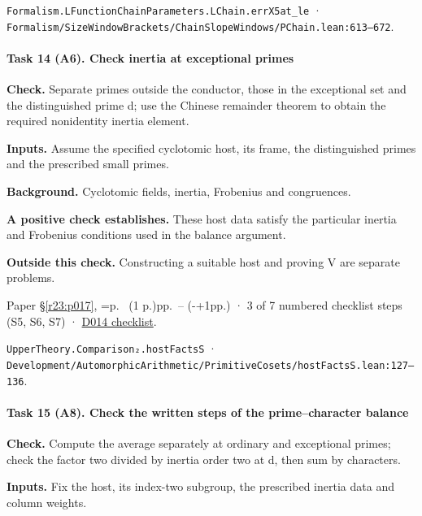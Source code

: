\nolinkurl{Formalism.LFunctionChainParameters.LChain.errX5at_le} · \nolinkurl{Formalism/SizeWindowBrackets/ChainSlopeWindows/PChain.lean:613–672}.

\paragraph{Task 14 (A6). Check inertia at exceptional primes}\label{v7:task-14}

\textbf{Check.} Separate primes outside the conductor, those in the exceptional set and the distinguished prime d; use the Chinese remainder theorem to obtain the required nonidentity inertia element.

\textbf{Inputs.} Assume the specified cyclotomic host, its frame, the distinguished primes and the prescribed small primes.

\textbf{Background.} Cyclotomic fields, inertia, Frobenius and congruences.

\textbf{A positive check establishes.} These host data satisfy the particular inertia and Frobenius conditions used in the balance argument.

\textbf{Outside this check.} Constructing a suitable host and proving V are separate problems.

Paper \S\ref{r23:p017}, \ifnum{}=\relax p.\ \pageref{r24:hostfacts} (1 p.)\else pp.\ \pageref{r24:hostfacts}--\pageref{v5:hostfacts-end} (\number\numexpr{}-+1\relax pp.)\fi{} · 3 of 7 numbered checklist steps (S5, S6, S7) · \href{https://github.com/GunheeC/rh-lean-verification-atlas/blob/v0.1.0/units/D014.check.md}{D014 checklist}.

\nolinkurl{UpperTheory.Comparison₂.hostFactsS} · \nolinkurl{Development/AutomorphicArithmetic/PrimitiveCosets/hostFactsS.lean:127–136}.

\paragraph{Task 15 (A8). Check the written steps of the prime–character balance}\label{v7:task-15}

\textbf{Check.} Compute the average separately at ordinary and exceptional primes; check the factor two divided by inertia order two at d, then sum by characters.

\textbf{Inputs.} Fix the host, its index-two subgroup, the prescribed inertia data and column weights.

